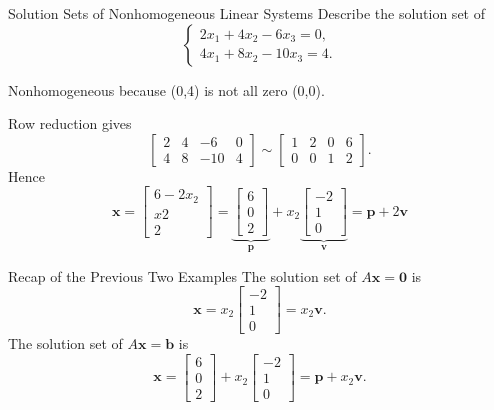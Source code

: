 \begin{frame}{Solution Sets of Nonhomogeneous Linear Systems}
  Describe the solution set of
  \[
    \begin{cases}
      2x_1+4x_2-6x_3=0,\\
      4x_1+8x_2-10x_3=4.
    \end{cases}
  \]

  Nonhomogeneous because (0,4) is not all zero (0,0).

  Row reduction gives
  \[
    \left[\begin{array}{ccc|c}2&4&-6&0\\4&8&-10&4\end{array}\right]
    \sim
    \left[\begin{array}{ccc|c}1&2&0&6\\0&0&1&2\end{array}\right].
  \]
  Hence
  \[
    \mathbf{x}
    = \begin{bmatrix}6-2x_2\\x2\\2\end{bmatrix}
    =\underbrace{\begin{bmatrix}6\\0\\2\end{bmatrix}}_{\mathbf{p}}
     +x_2\underbrace{\begin{bmatrix}-2\\1\\0\end{bmatrix}}_{\mathbf{v}}
    = \mathbf{p}+2\mathbf{v}
  \]
\end{frame}

\begin{frame}{Recap of the Previous Two Examples}
  The solution set of $A\mathbf{x}=\mathbf{0}$ is
  \[
    \mathbf{x}=x_2\begin{bmatrix}-2\\1\\0\end{bmatrix}=x_2\mathbf{v}.
  \]
  The solution set of $A\mathbf{x}=\mathbf{b}$ is
  \[
    \mathbf{x}
    =\begin{bmatrix}6\\0\\2\end{bmatrix}
     +x_2\begin{bmatrix}-2\\1\\0\end{bmatrix}
    =\mathbf{p}+x_2\mathbf{v}.
  \]
\end{frame}

